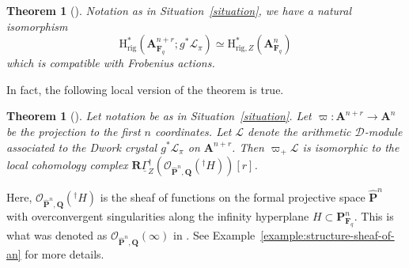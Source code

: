 \documentclass{amsart}
\numberwithin{equation}{section}
\theoremstyle{plain}
\newtheorem{theorem}[equation]{Theorem}
\theoremstyle{definition}
\renewcommand{\mathbb}{\mathbf}
\begin{document}
\begin{theorem}[{\cite[Theorem~3.1]{baldassarri-berthelot:dwork-cohomology-for-singular-hypersurfaces}}]\label{theorem:comparison}
Notation as in Situation~\ref{situation}, we have a natural isomorphism
\begin{equation*}
\mathrm{H}^{\ast}_{\mathrm{rig}}(\mathbb{A}_{\mathbb{F}_{q}}^{n+r};g^{\ast}\mathcal{L}_{\pi})
\simeq \mathrm{H}^{\ast}_{\mathrm{rig},Z}(\mathbb{A}_{\mathbb{F}_{q}}^{n})
\end{equation*}
which is compatible with Frobenius actions.
\end{theorem}

In fact, the following local version of the theorem is true.

\begin{theorem}[{\cite[Theorem~2.14]{baldassarri-berthelot:dwork-cohomology-for-singular-hypersurfaces}}]%
\label{theorem:local-comparison}
Let notation be as in Situation~\ref{situation}.  Let
\(\varpi\colon \mathbb{A}^{n+r} \to \mathbb{A}^{n}\) be the projection
to the first \(n\) coordinates.  Let \(\mathcal{L}\) denote the
arithmetic \(\mathscr{D}\)-module associated to the Dwork crystal
\(g^{\ast}\mathcal{L}_{\pi}\) on \(\mathbb{A}^{n+r}\).  Then \(\varpi_{+}\mathcal{L}\) is
isomorphic to the local cohomology complex
\(\mathbb{R}\underline{\Gamma}_{Z}^{\dagger}(\mathcal{O}_{\widehat{\mathbb{P}}^{n},\mathbb{Q}}({}^{\dagger}H))[r]\).
\end{theorem}



Here,
\(\mathcal{O}_{\widehat{\mathbb{P}}^{n},\mathbb{Q}}({}^{\dagger}H)\)
is the sheaf of functions on the formal projective space
\(\widehat{\mathbb{P}}^{n}\) with overconvergent singularities along
the infinity hyperplane \(H \subset \mathbb{P}^{n}_{\mathbb{F}_{q}}\).
This is what was denoted as
\(\mathcal{O}_{\widehat{\mathbb{P}}^{n},\mathbb{Q}}(\infty)\) in
\cite{baldassarri-berthelot:dwork-cohomology-for-singular-hypersurfaces}.
See Example~\ref{example:structure-sheaf-of-an} for more details.
\end{document}
